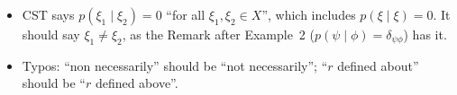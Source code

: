 \documentclass[11pt]{article}
\begin{document}
\begin{itemize}
  ). The obstruction would lie in
  $H^1_{dR}(S^2) = 0$, so no flux homomorphism is involved. Along an evolution from the identity,
  preserving the area and preserving the form agree, since a map preserving the area pulls the
  form back to $\pm$ itself at each point and the sign cannot jump
  (, );
  only single maps tell them apart.
\item CST says $p(\xi_1\mid\xi_2) = 0$ ``for all $\xi_1, \xi_2 \in X$'', which includes
  $p(\xi\mid\xi) = 0$. It should say $\xi_1 \ne \xi_2$, as the Remark after Example~2
  ($p(\psi\mid\phi) = \delta_{\psi\phi}$) has it.
\item Typos: ``non necessarily'' should be ``not necessarily''; ``$r$ defined about'' should be
  ``$r$ defined above''.
\end{itemize}
\end{document}
